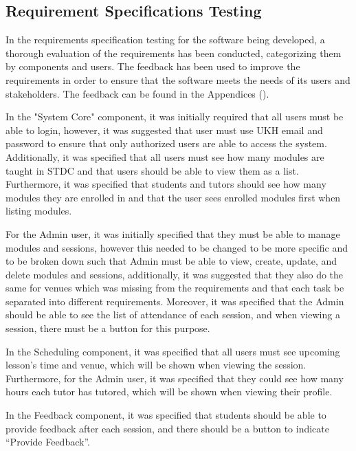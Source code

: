 \clearpage
\subsection{Requirement Specifications Testing}
\begin{justify}
    In the requirements specification testing for the software being developed, a thorough evaluation of the requirements has been conducted, categorizing them by components and users. The feedback has been used to improve the requirements in order to ensure that the software meets the needs of its users and stakeholders. The feedback can be found in the Appendices ({\pageref{Appendix 2}}).

    \vspace{0.25cm}
    \newendline In the "System Core" component, it was initially required that all users must be able to login, however, it was suggested that user must use UKH email and password to ensure that only authorized users are able to access the system. Additionally, it was specified that all users must see how many modules are taught in STDC and that users should be able to view them as a list. Furthermore, it was specified that students and tutors should see how many modules they are enrolled in and that the user sees enrolled modules first when listing modules.

    \vspace{0.25cm}
    \newendline For the Admin user, it was initially specified that they must be able to manage modules and sessions, however this needed to be changed to be more specific and to be broken down such that Admin must be able to view, create, update, and delete modules and sessions, additionally, it was suggested that they also do the same for venues which was missing from the requirements and that each task be separated into different requirements. Moreover, it was specified that the Admin should be able to see the list of attendance of each session, and when viewing a session, there must be a button for this purpose.

    \vspace{0.25cm}
    \newendline In the Scheduling component, it was specified that all users must see upcoming lesson’s time and venue, which will be shown when viewing the session. Furthermore, for the Admin user, it was specified that they could see how many hours each tutor has tutored, which will be shown when viewing their profile.

    \vspace{0.25cm}
    \newendline In the Feedback component, it was specified that students should be able to provide feedback after each session, and there should be a button to indicate “Provide Feedback”.


\end{justify}
